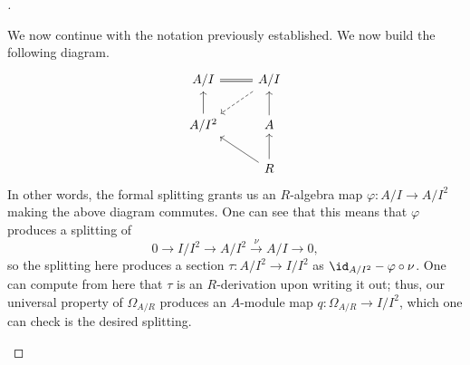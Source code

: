 \documentclass[../notes.tex]{subfiles}
\begin{document}
\begin{proof}[]
\begin{itemize}
		We now continue with the notation previously established. We now build the following diagram.
		\[\begin{tikzcd}
			{A/I} & {A/I} \\
			{A/I^2} & A \\
			& R
			\arrow[Rightarrow, no head, from=1-2, to=1-1]
			\arrow[from=3-2, to=2-2]
			\arrow[from=2-2, to=1-2]
			\arrow[from=2-1, to=1-1]
			\arrow[from=3-2, to=2-1]
			\arrow[dashed, from=1-2, to=2-1]
		\end{tikzcd}\]
		In other words, the formal splitting grants us an $R$-algebra map $\varphi\colon A/I\to A/I^2$ making the above diagram commutes. One can see that this means that $\varphi$ produces a splitting of
		\[0\to I/I^2\to A/I^2\stackrel\nu\to A/I\to0,\]
		so the splitting here produces a section $\tau\colon A/I^2\to I/I^2$ as ${\id_{A/I^2}}-\varphi\circ\nu$. One can compute from here that $\tau$ is an $R$-derivation upon writing it out; thus, our universal property of $\Omega_{A/R}$ produces an $A$-module map $q\colon\Omega_{A/R}\to I/I^2$, which one can check is the desired splitting.
		\qedhere
	\end{itemize}
\end{proof}
\end{document}
